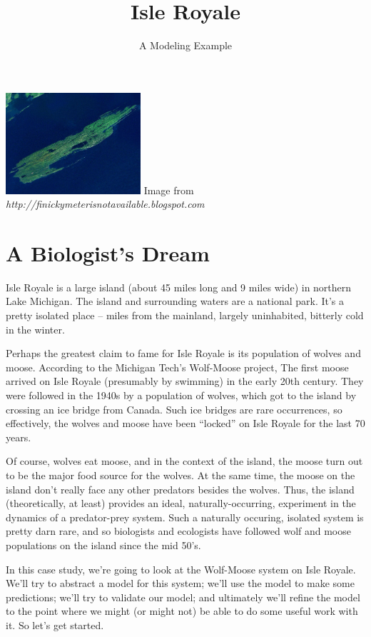 \documentclass{tufte-handout}
\title{Isle Royale}
\author{A Modeling Example}
\begin{document}
\maketitle

\begin{marginfigure}
\includegraphics[width=5cm]{figs/IsleRoyale}
Image from {\em{http://finickymeterisnotavailable.blogspot.com}}
\end{marginfigure}


\section{A Biologist's Dream}
Isle Royale is a large island (about 45 miles long and 9 miles wide) in northern Lake Michigan.  The island and surrounding waters are a national park.  It's a pretty isolated place -- miles from the mainland, largely uninhabited, bitterly cold in the winter.

Perhaps the greatest claim to fame for Isle Royale is its population of wolves and moose.   According to the Michigan Tech's Wolf-Moose project, The first moose arrived on Isle Royale (presumably by swimming) in the early 20th century.  They were followed in the 1940s by a population of wolves, which got to the island by crossing an ice bridge from Canada.  Such ice bridges are rare occurrences, so effectively, the wolves and moose have been ``locked'' on Isle Royale for the last 70 years.

Of course, wolves eat moose, and in the context of the island, the moose turn out to be the major food source for the wolves.  At the same time, the moose on the island don't really face any other predators besides the wolves.  Thus, the island (theoretically, at least) provides an ideal, naturally-occurring, experiment in the dynamics of a predator-prey system.  Such a naturally occuring, isolated system is pretty darn rare, and so biologists and ecologists have followed wolf and moose populations on the island since the mid 50's.

In this case study, we're going to look at the Wolf-Moose system on Isle Royale.  We'll try to abstract a model for this system; we'll use the model to make some predictions; we'll try to validate our model; and ultimately we'll refine the model to the point where we might (or might not) be able to do some useful work with it.  So let's get started.
\end{document}
